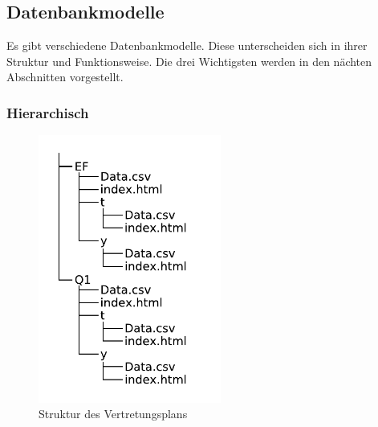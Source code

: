 \documentclass[a4paper, 12pt]{article}
\theoremstyle{plain}
\theoremstyle{definition}
\begin{document}
	
	
	\subsection{Datenbankmodelle}
	\label{sec:dbMod}
	Es gibt verschiedene Datenbankmodelle. Diese unterscheiden sich in ihrer Struktur und Funktionsweise. Die drei Wichtigsten werden in den nächten Abschnitten vorgestellt.
	
	\subsubsection{Hierarchisch}
	\label{sec:hierdb}
	
	\begin{figure}
	\vspace{-28pt}
	\includegraphics[width=6cm]{vStruk.pdf}
	\vspace{-45pt}
	\caption{Struktur des Vertretungsplans}\label{fig:verTree}
	\end{figure}
\end{document}
